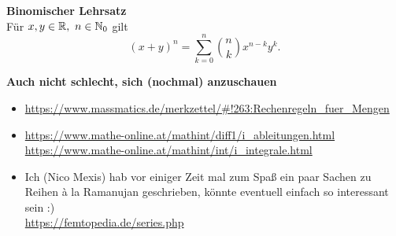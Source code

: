\textbf{Binomischer Lehrsatz}\\
Für $x,y\in\mathbb{R},\ n\in\mathbb{N}_0$ gilt
\[
  (x+y)^n=\sum_{k=0}^n\binom{n}{k}x^{n-k}y^k.
\]

\vspace*{-0.1cm}
\textbf{Auch nicht schlecht, sich (nochmal) anzuschauen}
\begin{itemize}
\item \url{https://www.massmatics.de/merkzettel/#!263:Rechenregeln_fuer_Mengen}

\item \url{https://www.mathe-online.at/mathint/diff1/i_ableitungen.html}\\
\url{https://www.mathe-online.at/mathint/int/i_integrale.html}

\item Ich (Nico Mexis) hab vor einiger Zeit mal zum Spaß ein paar Sachen zu Reihen à la Ramanujan geschrieben, könnte eventuell einfach so interessant sein :)\\
\url{https://femtopedia.de/series.php}
\end{itemize}
